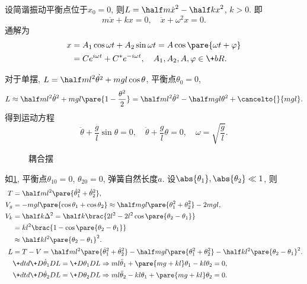 \documentclass[../LectureNotes.tex]{subfiles}
\begin{document}
设简谐振动平衡点位于$x_0=0$, 则$\displaystyle L = \half m\dot{x}^2 - \half kx^2$, $k>0$. 即
\[ m\ddot{x} + kx = 0,\quad \ddot{x} + \omega^2 x = 0. \]
通解为
\begin{align*}
    x &= A_1 \cos\omega t + A_2 \sin\omega t = A\cos\pare{\omega t + \varphi} \\ &= Ce^{i\omega t} + C^* e^{-i\omega t},\quad A_1, A_2, A, \varphi \in \+bR.
\end{align*}
\begin{sample}
    \begin{ex}
        对于单摆, $\displaystyle L = \half ml^2\dot{\theta^2} + mgl\cos\theta$, 平衡点$\theta_0 = 0$,
        \[ L \approx \half ml^2\dot{\theta}^2 + mgl\pare{1-\frac{\theta^2}{2}} = \half ml^2\dot{\theta}^2 - \half mgl\theta^2 + \cancelto{}{mgl}. \]
        得到运动方程
        \[ \ddot{\theta} + \frac{g}{l}\sin\theta = 0,\quad \ddot{\theta} + \frac{g}{l}\theta = 0,\quad \omega = \sqrt{\frac{g}{l}}. \]
    \end{ex}
\end{sample}
\begin{figure}[ht]
    \centering
    \caption{耦合摆}
    \label{fig:耦合摆}
\end{figure}
\begin{sample}
    \begin{ex}[耦合摆]
        \label{ex:耦合摆}
        如\cref{fig:耦合摆}, 平衡点$\theta_{10} = 0$, $\theta_{20} = 0$, 弹簧自然长度$a$. 设$\abs{\theta_1}, \abs{\theta_2}\ll 1$, 则
        \begin{align}
            T &= \half ml^2\pare{\dot{\theta}_1^2 + \dot{\theta}_2^2}, \notag\\
            V_g &= -mgl\pare{\cos\theta_1 + \cos\theta_2} \approx \half mgl\pare{\theta_1^2 + \theta_2^2} - 2mgl, \notag\\
            V_k &= \half k \Delta^2 = \half k\brac{2l^2 - 2l^2 \cos\pare{\theta_2 - \theta_1}}\notag\\
            &= kl^2 \brac{1-\cos\pare{\theta_2 - \theta_1}} \notag\\
            &\approx \half kl^2 \pare{\theta_2 - \theta_1}^2.\notag\\
            L &= T-V = \half ml^2\pare{\dot{\theta}_1^2 + \dot{\theta}_2^2} - \half mgl\pare{\theta_1^2 + \theta_2^2} - \half kl^2\pare{\theta_2 - \theta_1}^2.\notag\\
            \label{eq:耦合摆1}
            &\+dtd{}\+D{\dot{\theta}_1}DL = \+D{\theta_1}DL \Rightarrow ml\ddot{\theta}_1 + \pare{mg+kl}\theta_1 - kl\theta_2 = 0, \\
            \label{eq:耦合摆2}
            &\+dtd{}\+D{\dot{\theta}_2}DL = \+D{\theta_2}DL \Rightarrow ml\ddot{\theta}_2 - kl\theta_1 + \pare{mg+kl}\theta_2 = 0.
        \end{align}
    \end{ex}
\end{sample}
\end{document}
